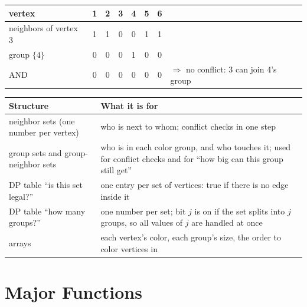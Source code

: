 \documentclass[11pt]{article}
\begin{document}
\begin{center}
\begin{tabular}{@{}lcccccc@{\qquad}l@{}}
\toprule
vertex & 1 & 2 & 3 & 4 & 5 & 6 & \\
\midrule
neighbors of vertex 3 & 1 & 1 & 0 & 0 & 1 & 1 & \\
group $\{4\}$          & 0 & 0 & 0 & 1 & 0 & 0 & \\
\midrule
AND                    & 0 & 0 & 0 & 0 & 0 & 0 & $\Rightarrow$ no conflict: 3 can join 4's group \\
\bottomrule
\end{tabular}
\end{center}

\noindent\begin{minipage}{\textwidth}
\begin{tabular}{@{}>{\raggedright\arraybackslash}p{4.6cm}>{\raggedright\arraybackslash}p{11cm}@{}}
\toprule
Structure & What it is for \\
\midrule
neighbor sets (one number per vertex) & who is next to whom; conflict checks in one step \\
group sets and group-neighbor sets & who is in each color group, and who touches it; used for conflict checks and for ``how big can this group still get'' \\
DP table ``is this set legal?'' & one entry per set of vertices: true if there is no edge inside it \\
DP table ``how many groups?'' & one number per set; bit $j$ is on if the set splits into $j$ groups, so all values of $j$ are handled at once \\
arrays & each vertex's color, each group's size, the order to color vertices in \\
\bottomrule
\end{tabular}
\end{minipage}

\section{Major Functions}
\end{document}
